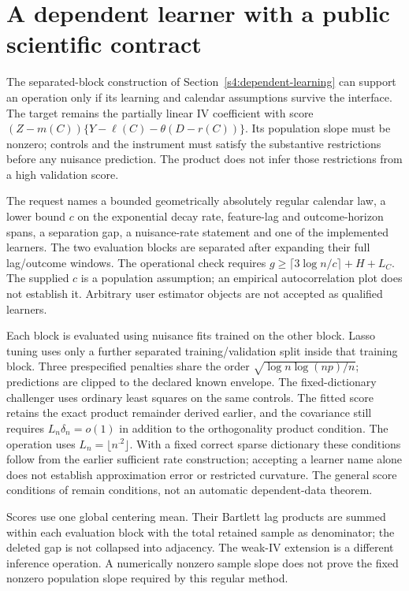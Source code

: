 \section{A dependent learner with a public scientific contract}
\label{c7:blocked-operation}
The separated-block construction of Section~\ref{s4:dependent-learning}
can support an operation only if its learning and calendar assumptions survive
the interface. The target remains the partially linear IV coefficient with
score $(Z-m(C))\{Y-\ell(C)-\theta(D-r(C))\}$. Its population slope must be
nonzero; controls and the instrument must satisfy the substantive restrictions
before any nuisance prediction. The product does not infer those restrictions
from a high validation score.

The request names a bounded geometrically absolutely regular calendar law,
a lower bound $c$ on the exponential decay rate, feature-lag and outcome-horizon
spans, a separation gap, a nuisance-rate statement and one of the implemented
learners. The two evaluation blocks are separated after expanding their full
lag/outcome windows. The operational check requires
$g\ge\lceil3\log n/c\rceil+H+L_C$. The supplied $c$ is a population
assumption; an empirical autocorrelation plot does not establish it. Arbitrary
user estimator objects are not accepted as qualified learners.

Each block is evaluated using nuisance fits trained on the other block. Lasso
tuning uses only a further separated training/validation split inside that
training block. Three prespecified penalties share the order
$\sqrt{\log n\log(np)/n}$; predictions are clipped to the declared known
envelope. The fixed-dictionary challenger uses ordinary least squares on the
same controls. The fitted score retains the exact product remainder derived
earlier, and the covariance still requires $L_n\delta_n=o(1)$ in addition to
the orthogonality product condition. The operation uses $L_n=\lfloor n^{.2}\rfloor$.
With a fixed correct sparse dictionary these conditions follow from the
earlier sufficient rate construction; accepting a learner name alone does
not establish approximation error or restricted curvature. The general score
conditions of \citet[Assumptions 3.1--3.2]{dml2018} remain conditions, not an
automatic dependent-data theorem.

Scores use one global centering mean. Their Bartlett lag products are summed
within each evaluation block with the total retained sample as denominator;
the deleted gap is not collapsed into adjacency. The weak-IV extension is a
different inference operation. A numerically nonzero sample slope does not
prove the fixed nonzero population slope required by this regular method.

